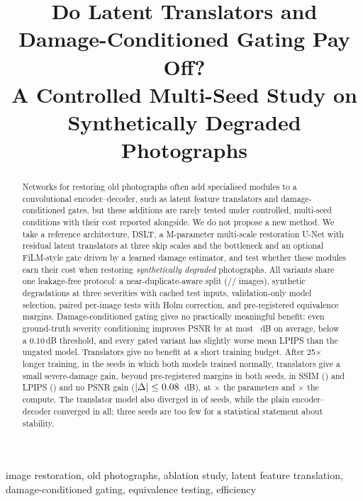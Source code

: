 \documentclass[conference]{IEEEtran}
\newcommand{\method}{DSLT}
\newcommand{\pending}[1]{\textcolor{red}{[PENDING: #1]}}
\begin{document}
\title{Do Latent Translators and Damage-Conditioned Gating Pay Off?\\
A Controlled Multi-Seed Study on Synthetically Degraded Photographs}

\author{\IEEEauthorblockN{\pending{authors and affiliations; omit if review is double-blind}}}

\maketitle

\begin{abstract}
Networks for restoring old photographs often add specialised modules to a convolutional encoder--decoder,
such as latent feature translators and damage-conditioned gates, but these additions are rarely tested under
controlled, multi-seed conditions with their cost reported alongside. We do not propose a new method. We take a
reference architecture, \method{}, a \nParamsFull{}M-parameter multi-scale restoration U-Net with residual latent
translators at three skip scales and the bottleneck and an optional FiLM-style gate driven by a learned damage
estimator, and test whether these modules earn their cost when restoring \emph{synthetically degraded}
photographs. All variants share one leakage-free protocol: a near-duplicate-aware split
(\nTrain{}/\nVal{}/\nTest{} images), synthetic degradations at three severities with cached test inputs, validation-only model selection, paired per-image tests with Holm correction, and pre-registered
equivalence margins. Damage-conditioned gating gives no practically meaningful benefit: even ground-truth severity
conditioning improves PSNR by at most \nOASevPSNR{}~dB on average, below a 0.10\,dB threshold, and every gated
variant has slightly worse mean LPIPS than the ungated model. Translators
give no benefit at a short training budget. After 25$\times$ longer training, in the \nConvSeeds{} seeds in which
both models trained normally, translators give a small severe-damage gain, beyond pre-registered margins in
both seeds, in SSIM
(\nSevSSIMgain{}) and LPIPS (\nSevLPIPSgain{}) and no PSNR gain ($|\Delta|\le0.08$~dB), at
\nParamRatio$\times$ the parameters and \nMACsRatio$\times$ the compute. The translator model also diverged in \nDivFull{} of \nSeedsAll{} seeds, while the plain encoder--decoder
converged in all; three seeds are too few for a statistical statement about stability.
\end{abstract}

\begin{IEEEkeywords}
image restoration, old photographs, ablation study, latent feature translation, damage-conditioned gating,
equivalence testing, efficiency
\end{IEEEkeywords}
\end{document}
